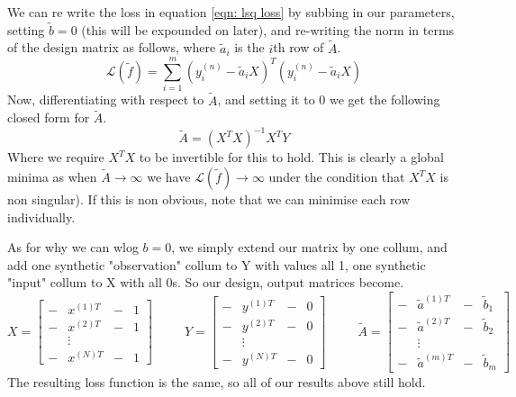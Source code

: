 \documentclass[letterpaper, 12pt]{article}
\newcommand{\1}{\mathds{1}}	%
\begin{document}
We can re write the loss in equation \ref{eqn: lsq loss} by subbing in our parameters, setting \(\tilde{b}=0\) (this will be expounded on later), and re-writing the norm in terms of the design matrix as follows, where \(\tilde{a}_i\) is the \(i\)th row of \(\tilde{A}\).
\begin{equation}
    \mathscr{L}(\tilde{f}) = \sum_{i=1}^m (y^{(n)}_i - \tilde{a}_i X)^T(y^{(n)}_i - \tilde{a}_i X)
\end{equation}
Now, differentiating with respect to \(\tilde{A}\), and setting it to 0 we get the following closed form for \(\tilde{A}\).
\begin{equation}
    \tilde{A} = (X^T X)^{-1}X^T Y
\end{equation}
Where we require \(X^T X\) to be invertible for this to hold. This is clearly a global minima as when \(\tilde{A} \to \infty\) we have \(\mathscr{L}(\tilde{f}) \to \infty\) under the condition that \(X^TX\) is non singular). If this is non obvious, note that we can minimise each row individually. 

As for why we can wlog \(b=0\), we simply extend our matrix by one collum, and add one synthetic "observation" collum to Y with values all 1, one synthetic "input" collum to X with all 0s. So our design, output matrices become.
\begin{equation}
    X = 
    \begin{bmatrix}
        -&x^{(1)T} &-&1\\ -&x^{(2)T}&-&1 \\ &\vdots& \\ -&x^{(N)T}&- & 1
    \end{bmatrix} \hspace{30pt}
    Y = 
    \begin{bmatrix}
        -&y^{(1)T}&-&0 \\ - &y^{(2)T}&-&0 \\ & \vdots&  \\ - & y^{(N)T} & - & 0
    \end{bmatrix} \hspace{30pt}
    \tilde{A} =
    \begin{bmatrix}
        -&\tilde{a}^{(1)T} &-&\tilde{b}_1\\ -&\tilde{a}^{(2)T}&-& \tilde{b}_2\\ &\vdots& \\ -&\tilde{a}^{(m)T}&- & \tilde{b}_m
    \end{bmatrix}
\end{equation}
The resulting loss function is the same, so all of our results above still hold. 
\end{document}

